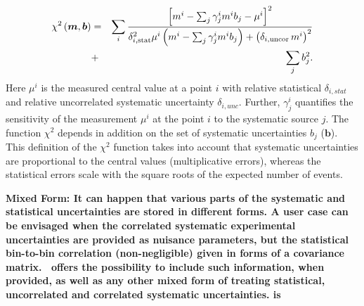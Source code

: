 \begin{description}
\begin{eqnarray} 
    \chi^2\left(\boldsymbol{m},\boldsymbol{b}\right) &= &  
 \sum_i \frac{\left[m^i - \sum_j \gamma^i_j m^i b_j  - {\mu^i} \right]^2}
{ \textstyle \delta^2_{i,{\rm stat}}\mu^i \left(m^i -  \sum_j \gamma^i_j m^i b_j\right)
  + \left(\delta_{i,{\rm uncor}}\,  m^i\right)^2} \nonumber \\
  &+& \sum_j b^2_j.
\label{eq:aven}
\end{eqnarray}
%
Here ${\mu^i}$ is the  measured central value  at a point $i$ 
with  relative statistical $\delta_{i,stat}$ 
and relative uncorrelated systematic uncertainty $\delta_{i,unc}$.
Further, 
$\gamma^i_j$ 
quantifies the sensitivity of the
measurement ${\mu^i}$ at the point $i$ to the systematic source $j$. 
The function $\chi^2$ depends in addition on
 the set of systematic uncertainties $b_j$ ($\boldsymbol{b}$).
This definition of the $\chi^2$ function takes into account that
systematic uncertainties are proportional to the central values 
(multiplicative errors), whereas the statistical errors scale 
with the square roots of the expected number of events. 
\item  \bf{Mixed Form:} \rm
It can happen that various parts of the systematic and statistical uncertainties are stored in different forms.  A user case can be envisaged when the correlated systematic experimental uncertainties are provided as nuisance parameters, but the statistical bin-to-bin correlation (non-negligible) given in forms of a covariance matrix. \fitter\ offers the possibility to include such information, when provided, as well as any other mixed form of treating statistical, uncorrelated and correlated systematic uncertainties. 
is
\end{description}


